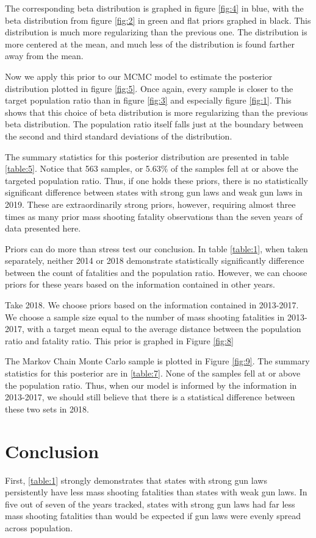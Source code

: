 \documentclass{article}
\begin{document}
The corresponding beta distribution is graphed in figure \ref{fig:4} in blue,  with the beta distribution from figure \ref{fig:2} in green and flat priors graphed in black. This distribution is much more regularizing than the previous one. The distribution is more centered at the mean, and much less of the distribution is found farther away from the mean. 

Now we apply this prior to our MCMC model to estimate the posterior distribution plotted in figure \ref{fig:5}. Once again, every sample is closer to the target population ratio than in figure \ref{fig:3} and especially figure \ref{fig:1}. This shows that this choice of beta distribution is more regularizing than the previous beta distribution. The population ratio itself falls just at the boundary between the second and third standard deviations of the distribution. 

The summary statistics for this posterior distribution are presented in table \ref{table:5}. Notice that 563 samples, or 5.63$\%$ of the samples fell at or above the targeted population ratio. Thus, if one holds these priors, there is no statistically significant difference between states with strong gun laws and weak gun laws in 2019. These are extraordinarily strong priors, however, requiring almost three times as many prior mass shooting fatality observations than the seven years of data presented here.

Priors can do more than stress test our conclusion. In table \ref{table:1}, when taken separately, neither 2014 or 2018 demonstrate statistically significantly difference between the count of fatalities and the population ratio. However, we can choose priors for these years based on the information contained in other years. 

Take 2018. We choose priors based on the information contained in 2013-2017. We choose a sample size equal to the number of mass shooting fatalities in 2013-2017, with a target mean equal to the average distance between the population ratio and fatality ratio. This prior is graphed in Figure \ref{fig:8}

The Markov Chain Monte Carlo sample is plotted in Figure \ref{fig:9}. The summary statistics for this posterior are in \ref{table:7}. None of the samples fell at or above the population ratio. Thus, when our model is informed by the information in 2013-2017, we should still believe that there is a statistical difference between these two sets in 2018. 

\section{Conclusion}
First, \ref{table:1} strongly demonstrates that states with strong gun laws persistently have less mass shooting fatalities than states with weak gun laws. In five out of seven of the years tracked, states with strong gun laws had far less mass shooting fatalities than would be expected if gun laws were evenly spread across population.
\end{document}
